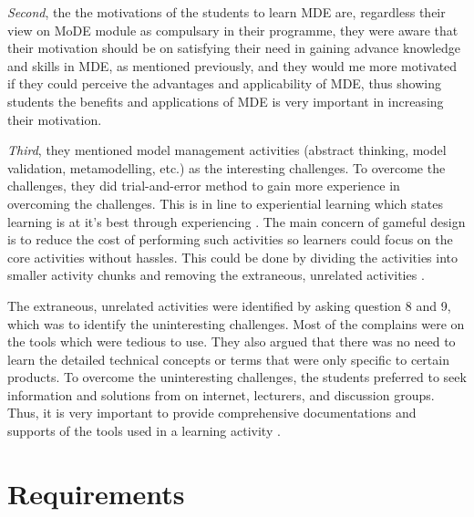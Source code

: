 \documentclass[12pt, a4paper]{report}
\begin{document}
\textit{Second}, the the motivations of the students to learn MDE are, regardless their view on MoDE module as compulsary in their programme, they were aware that their motivation should be on satisfying their need in gaining advance knowledge and skills in MDE, as mentioned previously, and they would me more motivated if they could perceive the advantages and applicability of MDE, thus showing students the benefits and applications of MDE is very important in increasing their motivation.

\textit{Third}, they mentioned model management activities (abstract thinking, model validation, metamodelling, etc.) as the interesting challenges. To overcome the challenges, they did trial-and-error method to gain more experience in overcoming the challenges. This is in line to experiential learning which states learning is at it's best through experiencing \cite{kolb2014experiential}. The main concern of gameful design is to reduce the cost of  performing such activities so learners could focus on the core activities without hassles. This could be done by dividing the activities into smaller activity chunks and removing the extraneous, unrelated activities \cite{deterding2015lens}. 

The extraneous, unrelated activities were identified by asking question 8 and 9, which was to identify the uninteresting challenges. Most of the complains were on the tools which were tedious to use. They also argued that there was no need to learn the detailed technical concepts or terms that were only specific to certain products. To overcome the uninteresting challenges, the students preferred to seek information and solutions from on internet, lecturers, and discussion groups. Thus, it is very important to provide comprehensive documentations and supports of the tools used in a learning activity  \cite{liebel2015ready}.      

\section{Requirements}
\end{document}
